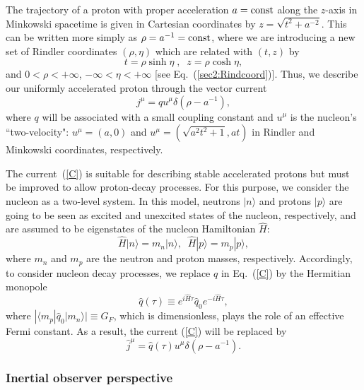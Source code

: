 \documentclass[12pt,nofootinbib,floatfix,aps,prd,showpacs,amsmath,amssymb,eqsecnum]{revtex4-2}
\begin{document}
The trajectory of a proton with proper acceleration 
$a = {\rm const}$ along the $z$-axis in Minkowski spacetime
is given in Cartesian coordinates by $ z = \sqrt{t^2 + a^{-2}} $. 
This can be written more simply as $\rho = a^{-1} = {\rm const}$, where
we are introducing a new set of Rindler coordinates 
$(\rho,\eta)$ which are related with $(t,z)$ by 
\begin{equation}
t = \rho \sinh \eta \;, \;\; z = \rho \cosh \eta,
\label{RCp}
\end{equation} 
and $0<\rho<+\infty$, $-\infty<\eta<+\infty$ 
[see Eq.~(\ref{sec2:Rindcoord})]. Thus, we describe our uniformly 
accelerated proton through the 
vector current 
\begin{equation}
j^\mu = q u^\mu \delta (\rho-a^{-1}),
\label{C}
\end{equation}
where $q$ will be associated with a small coupling constant and
$u^\mu$ is the nucleon's ``two-velocity":
$u^\mu = (a,0)$  and $u^\mu = (\sqrt{a^2 t^2 + 1}, at)$ 
in Rindler and  Minkowski coordinates, respectively.
 
The current~(\ref{C}) is suitable for describing stable accelerated 
protons but must be improved to allow proton-decay processes. For this 
purpose, we  consider the nucleon  as a two-level system. 
In this model, neutrons $|n \rangle$ and protons $|p  \rangle$ 
are going to be seen as excited and unexcited states of the nucleon, 
respectively, and are assumed to be eigenstates of the nucleon 
Hamiltonian $\hat H$:  
\begin{equation}
\hat H |n \rangle = m_n |n \rangle,\;\;
\hat H |p  \rangle = m_{p } |p  \rangle,
\end{equation}
where $m_n$ and $m_{p }$ are  the neutron and proton masses, 
respectively. Accordingly, to consider nucleon decay processes, 
we replace $q$ in Eq.~(\ref{C}) by the Hermitian monopole 
\begin{equation}
\hat q(\tau )\equiv e^{i\hat H \tau} \hat q_0 e^{-i\hat H \tau},
\label{Q}
\end{equation}
where $|\langle m_p | \hat q_0 | m_n \rangle |\equiv G_F  $, which is
dimensionless,
plays the role of an effective Fermi constant.
As a result, the current (\ref{C}) will be replaced by 
\begin{equation}
\hat j^\mu = \hat q(\tau) u^\mu \delta (\rho-a^{-1}) .
\label{CI}
\end{equation}

\subsubsection{Inertial observer perspective}
\label{subsubsection:DnipIop}
\end{document}

